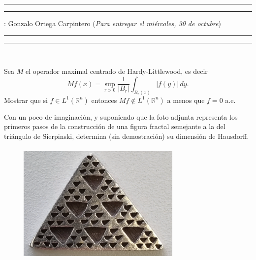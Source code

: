 \documentclass[11pt,a4paper]{article}
\begin{document}
\hrule\hrule
\vspace{2mm}


\vspace{3mm}

 : Gonzalo Ortega Carpintero \hfill ({\it Para entregar el miércoles, 30 de octubre})

\vspace{2mm}

\hrule\hrule

\vspace{2mm}

\


\vskip 3mm

 Sea $M$ el operador maximal centrado de Hardy-Littlewood, es decir
$$
Mf(x)=\sup_{r>0} \frac 1{|B_r|}\int_{B_r(x)}|f(y)|\, dy.
$$
Mostrar que si $f\in L^1(\mathbb R^n)$ entonces $Mf\notin L^1(\mathbb R^n)$ a menos que $f=0$ a.e.
\vskip 2mm

\vskip 6mm

  Con un poco de imaginación, y suponiendo que la foto adjunta representa los primeros pasos de la construcción de una figura fractal semejante a la del triángulo de Sierpinski, determina (sin demostración) su dimensión de Hausdorff.
 \begin{figure}[h] 
   \includegraphics[width=80mm, height=60mm] {triangle.png}    
\end{figure}

 
 
 
 \vskip 6mm
\end{document}
